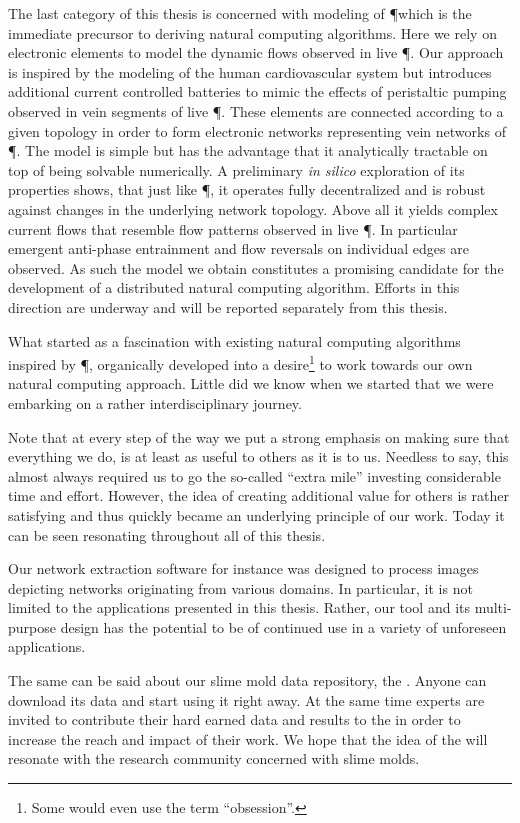 	The last category of this thesis is concerned with modeling of \P which is the immediate precursor to deriving natural computing algorithms. Here we rely on electronic elements to model the dynamic flows observed in live \P. Our approach is inspired by the modeling of the human cardiovascular system but introduces additional current controlled batteries to mimic the effects of peristaltic pumping observed in vein segments of live \P. These elements are connected according to a given topology in order to form electronic networks representing vein networks of \P. The model is simple but has the advantage that it analytically tractable on top of being solvable numerically. A preliminary \emph{in silico} exploration of its properties shows, that just like \P, it operates fully decentralized and is robust against changes in the underlying network topology. Above all it yields complex current flows that resemble flow patterns observed in live \P. In particular emergent anti-phase entrainment and flow reversals on individual edges are observed. As such the model we obtain constitutes a promising candidate for the development of a distributed natural computing algorithm. Efforts in this direction are underway and will be reported separately from this thesis.

	What started as a fascination with existing natural computing algorithms inspired by \P, organically developed into a desire\footnote{Some would even use the term ``obsession''.} to work towards our own natural computing approach. Little did we know when we started that we were embarking on a rather interdisciplinary journey.

	Note that at every step of the way we put a strong emphasis on making sure that everything we do, is at least as useful to others as it is to us. Needless to say, this almost always required us to go the so-called ``extra mile'' investing considerable time and effort. However, the idea of creating additional value for others is rather satisfying and thus quickly became an underlying principle of our work. Today it can be seen resonating throughout all of this thesis. 

	Our network extraction software \NEFI for instance was designed to process images depicting networks originating from various domains. In particular, it is not limited to the applications presented in this thesis. Rather, our tool and its multi-purpose design has the potential to be of continued use in a variety of unforeseen applications.

	The same can be said about our slime mold data repository, the \SMGR. Anyone can download its data and start using it right away. At the same time experts are invited to contribute their hard earned data and results to the \SMGR in order to increase the reach and impact of their work. We hope that the idea of the \SMGR will resonate with the research community concerned with slime molds.

